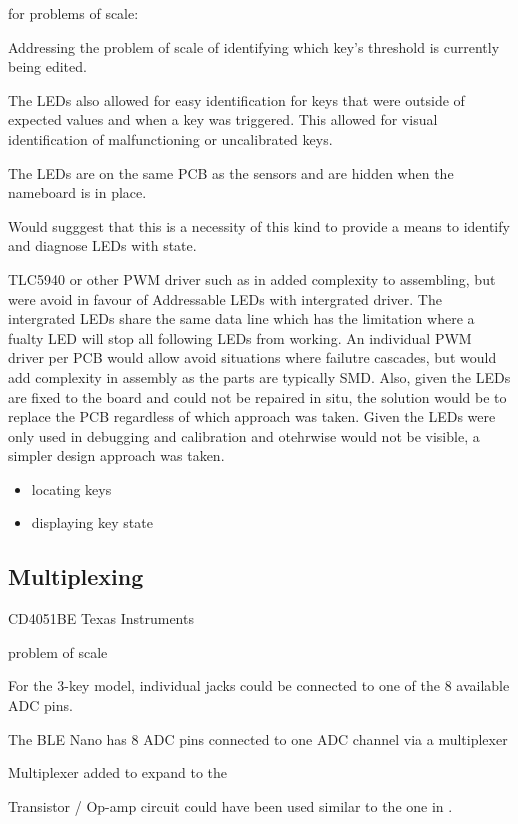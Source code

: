 for problems of scale:

Addressing the problem of scale of identifying which key's threshold is
currently being edited.

The LEDs also allowed for easy identification for keys that were outside
of expected values and when a key was triggered. This allowed for visual
identification of malfunctioning or uncalibrated keys.

The LEDs are on the same PCB as the sensors and are hidden when the
nameboard is in place.

Would sugggest that this is a necessity of this kind to provide a means
to identify and diagnose LEDs with state.

TLC5940 or other PWM driver such as in \cite{mcpherson} added complexity
to assembling, but were avoid in favour of Addressable LEDs with
intergrated driver. The intergrated LEDs share the same data line which
has the limitation where a fualty LED will stop all following LEDs from
working. An individual PWM driver per PCB would allow avoid situations
where failutre cascades, but would add complexity in assembly as the
parts are typically SMD. Also, given the LEDs are fixed to the board and
could not be repaired in situ, the solution would be to replace the PCB
regardless of which approach was taken. Given the LEDs were only used in
debugging and calibration and otehrwise would not be visible, a simpler
design approach was taken.

\begin{itemize}
\tightlist
\item
  locating keys
\item
  displaying key state
\end{itemize}

\subsection{Multiplexing}\label{multiplexing}

CD4051BE Texas Instruments

problem of scale

For the 3-key model, individual jacks could be connected to one of the 8
available ADC pins.

The BLE Nano has 8 ADC pins connected to one ADC channel via a
multiplexer

Multiplexer added to expand to the

Transistor / Op-amp circuit could have been used similar to the one in
\cite{mcpherson}.

